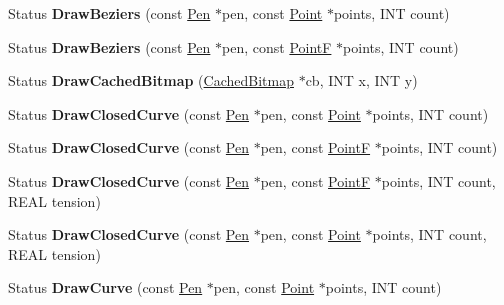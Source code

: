 \begin{DoxyCompactItemize}
\item 
\mbox{\label{class_graphics_aa9e9e3f91c8d96d89f57767ee8b93dfb}} 
Status {\bfseries Draw\+Beziers} (const \hyperlink{class_pen}{Pen} $\ast$pen, const \hyperlink{struct_point}{Point} $\ast$points, I\+NT count)
\item 
\mbox{\label{class_graphics_a9ebfc38e1d1e967fd986864d191542dc}} 
Status {\bfseries Draw\+Beziers} (const \hyperlink{class_pen}{Pen} $\ast$pen, const \hyperlink{struct_point_f}{PointF} $\ast$points, I\+NT count)
\item 
\mbox{\label{class_graphics_ad47597ecf625f1a4a205d96e3378f186}} 
Status {\bfseries Draw\+Cached\+Bitmap} (\hyperlink{class_cached_bitmap}{Cached\+Bitmap} $\ast$cb, I\+NT x, I\+NT y)
\item 
\mbox{\label{class_graphics_a8e9763123877b9e018df77ec08b9a02d}} 
Status {\bfseries Draw\+Closed\+Curve} (const \hyperlink{class_pen}{Pen} $\ast$pen, const \hyperlink{struct_point}{Point} $\ast$points, I\+NT count)
\item 
\mbox{\label{class_graphics_af5b9a4930c63c1992c80235ded2758c6}} 
Status {\bfseries Draw\+Closed\+Curve} (const \hyperlink{class_pen}{Pen} $\ast$pen, const \hyperlink{struct_point_f}{PointF} $\ast$points, I\+NT count)
\item 
\mbox{\label{class_graphics_a51c5c7099c8ac1eb4636afb63bbfa65a}} 
Status {\bfseries Draw\+Closed\+Curve} (const \hyperlink{class_pen}{Pen} $\ast$pen, const \hyperlink{struct_point_f}{PointF} $\ast$points, I\+NT count, R\+E\+AL tension)
\item 
\mbox{\label{class_graphics_a632da24914d79bcccdd575b05e5d18be}} 
Status {\bfseries Draw\+Closed\+Curve} (const \hyperlink{class_pen}{Pen} $\ast$pen, const \hyperlink{struct_point}{Point} $\ast$points, I\+NT count, R\+E\+AL tension)
\item 
\mbox{\label{class_graphics_a00f4a86bbf33a4d029da1f11ef93a454}} 
Status {\bfseries Draw\+Curve} (const \hyperlink{class_pen}{Pen} $\ast$pen, const \hyperlink{struct_point}{Point} $\ast$points, I\+NT count)
\item 

\end{DoxyCompactItemize}
